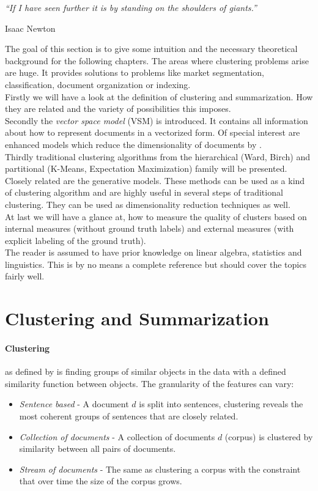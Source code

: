 \epigraph{\emph{
  ``If I have seen further it is by standing on the shoulders of giants.''
}}{ Isaac Newton }

The goal of this section is to give some intuition and the necessary theoretical background for the following chapters. The areas where clustering problems arise are huge. It provides solutions to problems like market segmentation, classification, document organization or indexing.\\
Firstly we will have a look at the definition of clustering and summarization. How they are related and the variety of possibilities this imposes.\\
Secondly the \emph{vector space model} (VSM) is introduced. It contains all information about how to represent documents in a vectorized form. Of special interest are enhanced models which reduce the dimensionality of documents by \svdfull{}.\\
Thirdly traditional clustering algorithms from the hierarchical (Ward, Birch) and partitional (K-Means, Expectation Maximization) family will be presented. Closely related are the generative models. These methods can be used as a kind of clustering algorithm and are highly useful in several steps of traditional clustering. They can be used as dimensionality reduction techniques as well.\\
At last we will have a glance at, how to measure the quality of clusters based on internal measures (without ground truth labels) and external measures (with explicit labeling of the ground truth).\\
The reader is assumed to have prior knowledge on linear algebra, statistics and linguistics. This is by no means a complete reference but should cover the topics fairly well.\\


\section{Clustering and Summarization}
\label{sec:basics_intro}

  \paragraph{Clustering} as defined by \cite{ClusterAlgoSurveyIBM} is finding groups of similar objects in the data with a defined similarity function between objects. The granularity of the features can vary:

  \begin{itemize}
    \item \emph{Sentence based} - A document $d$ is split into sentences, clustering reveals the most coherent groups of sentences that are closely related.
    \item \emph{Collection of documents} - A collection of documents $d$ (corpus) is clustered by similarity between all pairs of documents.
    \item \emph{Stream of documents} - The same as clustering a corpus with the constraint that over time the size of the corpus grows.
  \end{itemize}

